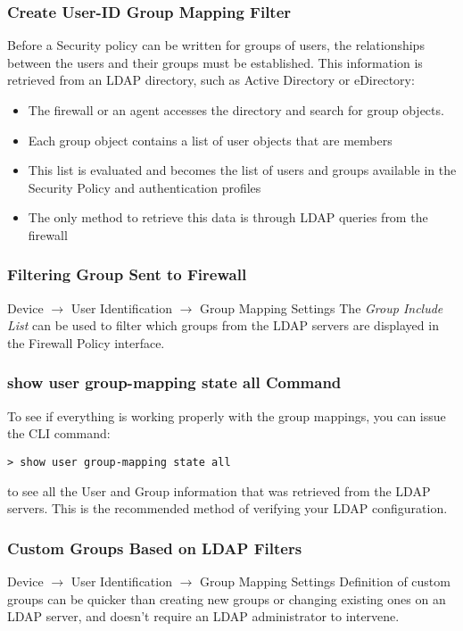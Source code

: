\subsubsection{Create User-ID Group Mapping Filter}
Before a Security policy can be written for groups of users, the relationships between the users and their groups must be established. 
This information is retrieved from an LDAP directory, such as Active Directory or eDirectory:
\begin{itemize}
   \item The firewall or an agent accesses the directory and search for group objects.
    \item Each group object contains a list of user objects that are members
    \item This list is evaluated and becomes the list of users and groups available in the Security Policy and authentication profiles
    \item The only method to retrieve this data is through LDAP queries from the firewall
\end{itemize}

\subsubsection{Filtering Group Sent to Firewall}
Device $\rightarrow$ User Identification $\rightarrow$ Group Mapping Settings
\newline The \textit{Group Include List} can be used to filter which groups from the LDAP servers are displayed in the Firewall Policy interface.

\subsubsection{show user group-mapping state all Command}
To see if everything is working properly with the group mappings, you can issue the CLI command:
\begin{verbatim}
> show user group-mapping state all    
\end{verbatim}
to see all the User and Group information that was retrieved from the LDAP servers.
This is the recommended method of verifying your LDAP configuration.

\subsubsection{Custom Groups Based on LDAP Filters}
Device $\rightarrow$ User Identification $\rightarrow$ Group Mapping Settings
\newline
Definition of custom groups can be quicker than creating new groups or changing existing ones on an LDAP server, and doesn't require an LDAP administrator to intervene.

